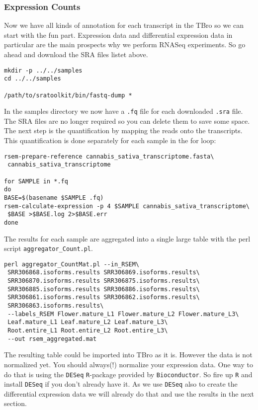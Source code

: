 \documentclass[english]{scrartcl}
\begin{document}
\subsubsection{Expression Counts}
Now we have all kinds of annotation for each transcript in the TBro so we can
start with the fun part. Expression data and differential expression data in
particular are the main prospects why we perform RNASeq experiments. So go ahead
and download the SRA files listet above.
\begin{lstlisting}
mkdir -p ../../samples
cd ../../samples

/path/to/sratoolkit/bin/fastq-dump *
\end{lstlisting}
In the samples directory we now have a \texttt{.fq} file for each downloaded
\texttt{.sra} file. The SRA files are no longer required so you can delete them
to save some space. The next step is the quantification by mapping the reads
onto the transcripts. This quantification is done separately for each sample in
the for loop:
\begin{lstlisting}
rsem-prepare-reference cannabis_sativa_transcriptome.fasta\
 cannabis_sativa_transcriptome

for SAMPLE in *.fq
do
BASE=$(basename $SAMPLE .fq)
rsem-calculate-expression -p 4 $SAMPLE cannabis_sativa_transcriptome\
 $BASE >$BASE.log 2>$BASE.err
done
\end{lstlisting}
The results for each sample are aggregated into a single large table with the
perl script \texttt{aggregator\_Count.pl}.
\begin{lstlisting}
perl aggregator_CountMat.pl --in_RSEM\
 SRR306868.isoforms.results SRR306869.isoforms.results\
 SRR306870.isoforms.results SRR306875.isoforms.results\
 SRR306885.isoforms.results SRR306886.isoforms.results\
 SRR306861.isoforms.results SRR306862.isoforms.results\
 SRR306863.isoforms.results\
 --labels_RSEM Flower.mature_L1 Flower.mature_L2 Flower.mature_L3\
 Leaf.mature_L1 Leaf.mature_L2 Leaf.mature_L3\
 Root.entire_L1 Root.entire_L2 Root.entire_L3\
 --out rsem_aggregated.mat
\end{lstlisting}
The resulting table could be imported into
TBro as it is. However the data is not normalized yet. You should always(!)
normalize your expression data. One way to do that is using the \texttt{DESeq}
\texttt{R}-package provided by \texttt{Bioconductor}. So fire up \texttt{R} and
install \texttt{DESeq} if you don't already have it. As we use \texttt{DESeq}
also to create the differential expression data we will already do that and use
the results in the next section.
\end{document}
